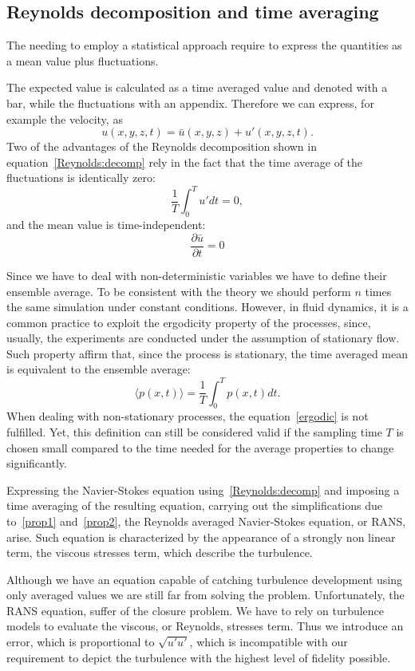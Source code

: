 \subsection{Reynolds decomposition and time averaging}
The needing to employ a statistical approach require to express the quantities as a mean value plus fluctuations.\par
The expected value is calculated as a time averaged value and denoted with a bar, while the fluctuations with an appendix. Therefore we can express, for example the velocity, as
\begin{equation}
u(x,y,z,t) = \bar{u}(x,y,z) + u'(x,y,z,t).
\label{Reynolds:decomp}
\end{equation}
Two of the advantages of the Reynolds decomposition shown in equation~\ref{Reynolds:decomp} rely in the fact that the time average of the fluctuations is identically zero:
\begin{equation}
\frac{1}{T} \int_{0}^{T} u' dt =0,
\label{prop1}
\end{equation}
and the mean value is time-independent:
\begin{equation}
\frac{\partial \bar{u} }{\partial t} = 0
\label{prop2}
\end{equation}
\par
Since we have to deal with non-deterministic variables we have to define their ensemble average. To be consistent with the theory we should perform $n$ times the same simulation under constant conditions.
However, in fluid dynamics, it is a common practice to exploit the ergodicity property of the processes, since, usually, the experiments are conducted under the assumption of stationary flow. 
Such property affirm that, since the process is stationary, the time averaged mean is equivalent to the ensemble average:
\begin{equation}
\langle p(x,t) \rangle = \frac{1}{T} \int_{0}^{T} p(x,t) dt.
\label{ergodic}
\end{equation}
When dealing with non-stationary processes, the equation~\ref{ergodic} is not fulfilled. Yet, this definition can still be considered valid if the sampling time $T$ is chosen small compared to the time needed for the average properties to change significantly.
\par
Expressing the Navier-Stokes equation using~\ref{Reynolds:decomp} and imposing a time averaging of the resulting equation, carrying out the simplifications due to~\ref{prop1} and~\ref{prop2}, the Reynolds averaged Navier-Stokes equation, or RANS, arise. Such equation is characterized by the appearance of a strongly non linear term, the viscous stresses term, which describe the turbulence.
\par
Although we have an equation capable of catching turbulence development using only averaged values we are still far from solving the problem. Unfortunately, the RANS equation, suffer of the closure problem. We have to rely on turbulence models to evaluate the viscous, or Reynolds, stresses term. Thus we introduce an error, which is proportional to $\sqrt{u'u'}$, which is incompatible with our requirement to depict the turbulence with the highest level of fidelity possible.





